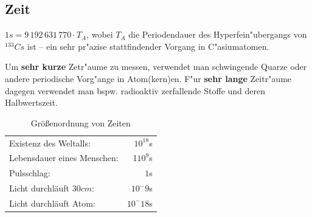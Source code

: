 \subsection{Zeit}

\begin{Def}\label{def_sekunde}
   $1s = 9 \, 192\, 631\, 770 \cdot T_A$, wobei $T_A$ die
   Periodendauer des Hyperfein"ubergangs von $^{133}Cs$ ist -- ein sehr
   pr"azise stattfindender Vorgang in C"asiumatomen.
\end{Def}

Um \textbf{sehr kurze} Zetr"aume zu messen, verwendet man schwingende
Quarze oder andere periodische Vorg"ange in Atom(kern)en. F"ur
\textbf{sehr lange} Zeitr"aume dagegen verwendet man bspw. radioaktiv
zerfallende Stoffe und deren Halbwertszeit.

 \begin{table}[ht]
 \begin{tabular}{l r}
 Existenz des Weltalls: & $10^{18} $s \\
 Lebensdauer eines Menschen: & 1$10^9 $s \\
 Pulsschlag: & $1 $s \\
 Licht durchläuft $30 cm$: & $10^-9 $s \\
 Licht durchläuft Atom: & $10^-18 $s
 \end{tabular}
\caption{Größenordnung von Zeiten}
 \end{table}

